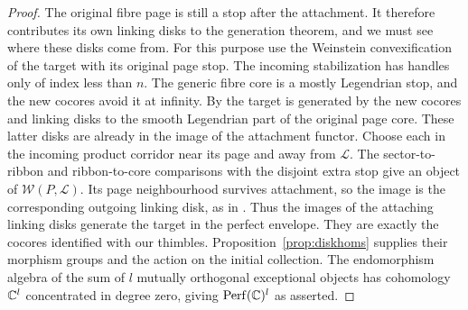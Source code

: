 \begin{proof}
The original fibre page is still a stop after the attachment. It therefore contributes its own linking disks to the generation theorem, and we must see where these disks come from. For this purpose use the Weinstein convexification of the target with its original page stop. The incoming stabilization has handles only of index less than $n$. The generic fibre core is a mostly Legendrian stop, and the new cocores avoid it at infinity. By \cite[Theorem~1.13]{GPS} the target is generated by the new cocores and linking disks to the smooth Legendrian part of the original page core. These latter disks are already in the image of the attachment functor. Choose each in the incoming product corridor near its page and away from $\mathcal L$. The sector-to-ribbon and ribbon-to-core comparisons with the disjoint extra stop give an object of $\mathcal W(P,\mathcal L)$. Its page neighbourhood survives attachment, so the image is the corresponding outgoing linking disk, as in \cite[(9.6)]{GPS}. Thus the images of the attaching linking disks generate the target in the perfect envelope. They are exactly the cocores identified with our thimbles. Proposition~\ref{prop:diskhoms} supplies their morphism groups and the action on the initial collection. The endomorphism algebra of the sum of $l$ mutually orthogonal exceptional objects has cohomology $\mathbb C^l$ concentrated in degree zero, giving $\mathrm{Perf}(\mathbb C)^l$ as asserted.
\end{proof}
